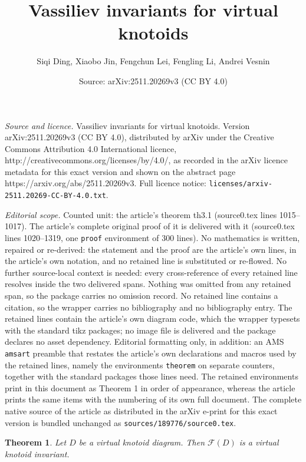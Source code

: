 \documentclass[10pt,a4paper]{amsart}
\title{Vassiliev invariants for virtual knotoids}
\author{Siqi Ding, Xiaobo Jin, Fengchun Lei, Fengling Li, Andrei Vesnin}
\date{Source: arXiv:2511.20269v3 (CC BY 4.0)}
\newtheorem{theorem}{Theorem}
\begin{document}
\maketitle

\noindent\emph{Source and licence.} Vassiliev invariants for virtual knotoids. Version arXiv:2511.20269v3 (CC BY 4.0), distributed by arXiv under the Creative Commons Attribution 4.0 International licence, http://creativecommons.org/licenses/by/4.0/, as recorded in the arXiv licence metadata for this exact version and shown on the abstract page https://arxiv.org/abs/2511.20269v3. Full licence notice: \texttt{licenses/arxiv-2511.20269-CC-BY-4.0.txt}.\par\smallskip

\noindent\textit{Editorial scope.} Counted unit: the article's theorem th3.1 (source0.tex lines 1015--1017). The article's complete original proof of it is delivered with it (source0.tex lines 1020--1319, one \texttt{proof} environment of 300 lines). No mathematics is written, repaired or re-derived: the statement and the proof are the article's own lines, in the article's own notation, and no retained line is substituted or re-flowed.  No further source-local context is needed: every cross-reference of every retained line resolves inside the two delivered spans.  Nothing was omitted from any retained span, so the package carries no omission record.  No retained line contains a citation, so the wrapper carries no bibliography and no bibliography entry.  The retained lines contain the article's own diagram code, which the wrapper typesets with the standard tikz packages; no image file is delivered and the package declares no asset dependency.  Editorial formatting only, in addition: an AMS \texttt{amsart} preamble that restates the article's own declarations and macros used by the retained lines, namely the environments \texttt{theorem} on separate counters, together with the standard packages those lines need.  The retained environments print in this document as Theorem 1 in order of appearance, whereas the article prints the same items with the numbering of its own full document.  The complete native source of the article as distributed in the arXiv e-print for this exact version is bundled unchanged as \texttt{sources/189776/source0.tex}.
\begin{theorem}\label{th3.1}
Let $D$ be a virtual knotoid diagram. Then $\mathcal{F} (D)$ is a virtual knotoid invariant.
\end{theorem}
\end{document}
